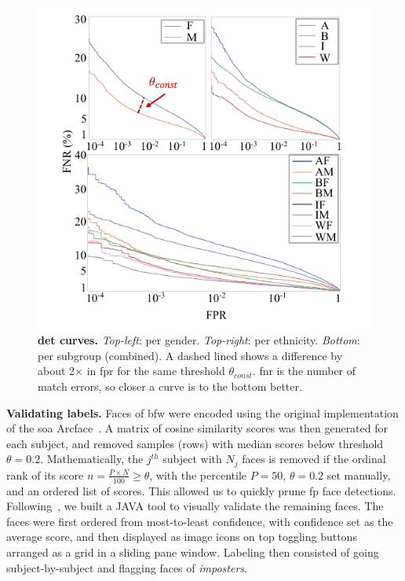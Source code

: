 \begin{figure}[!t] 
	\centering    
	\includegraphics[trim=7mm 0.1in 5mm 0in,clip,width=\linewidth]{images/detcurve-improved.pdf}
		\caption{\textbf{\gls{det} curves.} \emph{Top-left}: per gender. \emph{Top-right}: per ethnicity. \emph{Bottom}: per subgroup (\ie combined). A dashed lined shows a difference by about 2$\times$ in \gls{fpr} for the same threshold $\theta_{const}$. \gls{fnr} is the number of match errors, so closer a curve is to the bottom better.}
\label{fig:detcurves} 
\vspace{-5mm}
\end{figure} 

\vspace{1mm}
\noindent\textbf{Validating labels.} 
Faces of \gls{bfw} were encoded using the original implementation of the \gls{soa} Arcface~\cite{deng2019arcface}. A matrix of cosine similarity scores was then generated for each subject, and removed samples (\ie rows) with median scores below threshold $\theta=0.2$. Mathematically, the $j^{th}$ subject with $N_j$ faces is removed if the ordinal rank of its score $n = \frac{P\times N}{100}\geq\theta$, with the percentile $P=50$, $\theta=0.2$ set manually, and an ordered list of scores. This allowed us to quickly prune \gls{fp} face detections. Following~\cite{robinson2016families, robinson2018visual}, we built a JAVA tool to visually validate the remaining faces. The faces were first ordered from most-to-least confidence, with confidence set as the average score, and then displayed as image icons on top toggling buttons arranged as a grid in a sliding pane window. Labeling then consisted of going subject-by-subject and flagging faces of \emph{imposters}. 

